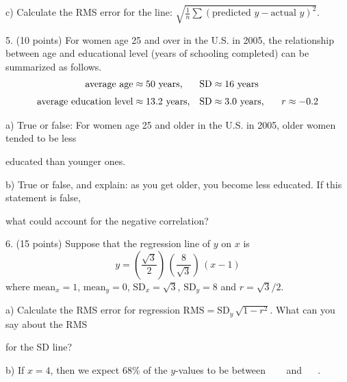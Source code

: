 \documentclass[10pt]{article}
\begin{document}
\hspace{10pt} c) Calculate the RMS error for the line:
$\displaystyle\sqrt{\frac{1}{n}\sum\left(\mbox{predicted $y$} - \mbox{actual $y$}\right)^2}$.
\vspace{2.8in}


5. (10 points) For women age 25 and over in the U.S. in 2005, the relationship between
age and educational level (years of schooling completed) can be summarized as
follows. 
\begin{align*}
\mbox{average age}         & \approx \mbox{50 years,}    & \mbox{SD} & \approx \mbox{16 years}\\[3pt]
\mbox{average education level}  & \approx \mbox{13.2 years,}  & \mbox{SD} & \approx \mbox{3.0 years,
   \hspace{15pt}} r\approx -0.2
\end{align*}

\hspace{20pt} a) True or false:  For women age 25 and older in the U.S. in 2005, older women tended 
to be less\vspace{-5pt}

\hspace{20pt} \hphantom{a) }  educated than younger ones.
\vspace{.5in}

\hspace{20pt} b) True or false, and explain:  as you get older, you become less educated.  
If this statement is false,\vspace{-4pt}

\hspace{20pt} \hphantom{a) }
what could account for the negative correlation?  
\vfill
\eject


6. (15 points) Suppose that the regression line of $y$ on $x$ 
is \[y=\left(\frac{\sqrt{3}}{2}\right)\,\left(\frac{8}{\sqrt{3}}\right)\,(x-1)\] 
where $\mbox{mean}_x=1$, $\mbox{mean}_y=0$, $\mbox{SD}_x=\sqrt{3}$, $\mbox{SD}_y=8$
and $r=\sqrt{3}/2$.\vspace{3pt}

\hspace{20pt} a) Calculate the RMS error for regression 
$\mbox{RMS}=\mbox{SD}_y\,\sqrt{1-r^2}$.  What can you say about the RMS\vspace{-4pt}

\hspace{20pt}\hphantom{b) } for the SD line?
\vspace{3in}

\hspace{20pt} b) If $x=4$, then we expect 68\% of the $y$-values to be
between \ \underline{\hspace{60pt}} \ \ and \  \underline{\hspace{60pt}} \ .
\vspace{2in}



\vfill
\eject
\end{document}
